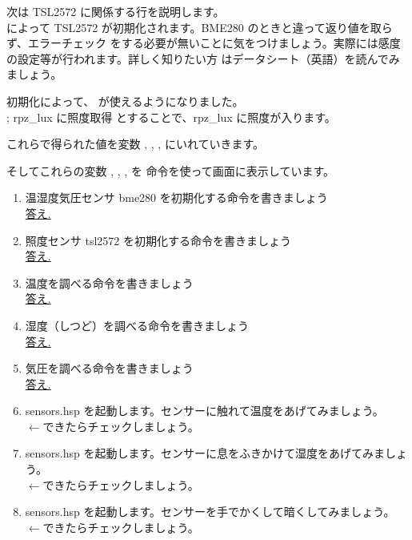 次は TSL2572 に関係する行を説明します。\\
によって TSL2572 が初期化されます。BME280 のときと違って返り値を取らず、エラーチェック
をする必要が無いことに気をつけましょう。実際には感度の設定等が行われます。詳しく知りたい方
はデータシート（英語）を読んでみましょう。

初期化によって、 が使えるようになりました。 \\
 ; rpz\_lux に照度取得
とすることで、rpz\_lux に照度が入ります。

これらで得られた値を変数 , , ,  にいれていきます。\\

そしてこれらの変数 , , ,  を  命令を使って画面に表示しています。\\

\begin{tcolorbox}[title=\useOmetoi]
\begin{enumerate}
\item 温湿度気圧センサ bme280 を初期化する命令を書きましょう\\
\underline{答え.\hspace{0.8\linewidth}}
\item 照度センサ tsl2572 を初期化する命令を書きましょう\\
\underline{答え.\hspace{0.8\linewidth}}
\item 温度を調べる命令を書きましょう\\
\underline{答え.\hspace{0.8\linewidth}}
\item 湿度（しつど）を調べる命令を書きましょう\\
\underline{答え.\hspace{0.8\linewidth}}
\item 気圧を調べる命令を書きましょう\\
\underline{答え.\hspace{0.8\linewidth}}
\item sensors.hsp を起動します。センサーに触れて温度をあげてみましょう。\\
\fbox{\phantom{白}} $\leftarrow$できたらチェックしましょう。
\item sensors.hsp を起動します。センサーに息をふきかけて湿度をあげてみましょう。\\
\fbox{\phantom{白}} $\leftarrow$できたらチェックしましょう。
\item  sensors.hsp を起動します。センサーを手でかくして暗くしてみましょう。\\
\fbox{\phantom{白}} $\leftarrow$できたらチェックしましょう。
\end{enumerate}
\end{tcolorbox}